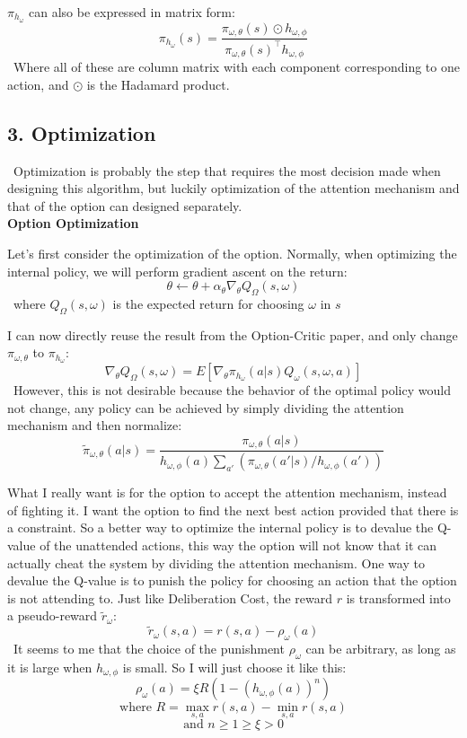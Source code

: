 \documentclass{article}
\begin{document}
	\quad $\pi_{h_\omega}$ can also be expressed in matrix form: $$\pi_{h_\omega}(s) = \frac{\pi_{\omega,\theta}(s)\odot h_{\omega, \phi}}{\pi_{\omega,\theta}(s)^\intercal h_{\omega, \phi}}$$ \qquad \ Where all of these are column matrix with each component corresponding to one action, and $\odot$ is the Hadamard product.
	\subsection*{3. Optimization}
	\qquad \ Optimization is probably the step that requires the most decision made when designing this algorithm, but luckily optimization of the attention mechanism and that of the option can designed separately.\vspace{0.2in}\\
	{\bfseries Option Optimization}\vspace{0.05in}
	
	\quad Let's first consider the optimization of the option. Normally, when optimizing the internal policy, we will perform gradient ascent on the return: $$\theta \leftarrow \theta + \alpha_\theta \nabla_\theta Q_\Omega(s,\omega)$$ \qquad \ where $Q_\Omega(s,\omega)$ is the expected return for choosing $\omega$ in $s$
	
	\quad I can now directly reuse the result from the Option-Critic paper, and only change $\pi_{\omega,\theta}$ to $\pi_{h_\omega}$: $$\nabla_\theta Q_\Omega(s,\omega) = E[\nabla_\theta \pi_{h_\omega}(a|s) Q_\omega(s,\omega,a)]$$
	\qquad \ However, this is not desirable because the behavior of the optimal policy would not change, any policy can be achieved by simply dividing the attention mechanism and then normalize: $$\widetilde{\pi}_{\omega,\theta}(a|s) = \frac{\pi_{\omega,\theta}(a|s) }{h_{\omega, \phi}(a)\sum_{a'} (\pi_{\omega,\theta}(a'|s)/h_{\omega, \phi}(a'))}$$
	
	\quad What I really want is for the option to accept the attention mechanism, instead of fighting it. I want the option to find the next best action provided that there is a constraint. So a better way to optimize the internal policy is to devalue the Q-value of the unattended actions, this way the option will not know that it can actually cheat the system by dividing the attention mechanism. One way to devalue the Q-value is to punish the policy for choosing an action that the option is not attending to. Just like Deliberation Cost, the reward $r$ is transformed into a pseudo-reward $\widetilde{r}_\omega$: $$\widetilde{r}_\omega(s,a)=r(s,a)-\rho_\omega(a)$$ \qquad \ It seems to me that the choice of the punishment $\rho_\omega$ can be arbitrary, as long as it is large when $h_{\omega,\phi}$ is small. So I will just choose it like this:$$\rho_\omega(a)=\xi R (1-(h_{\omega,\phi}(a))^n)$$ $$\textrm{where } R=\max_{s,a}r(s,a)-\min_{s,a}r(s,a)$$ $$ \textrm{and } n\geq 1\geq\xi>0$$
	
\end{document}
